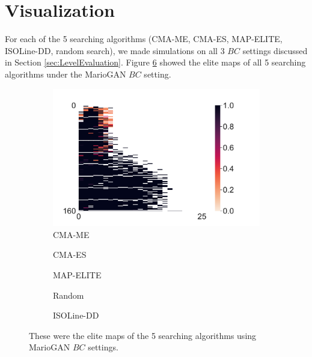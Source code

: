 \documentclass[conference]{IEEEtran}
\begin{document}
\section{Visualization}\label{sec:Visualization}
For each of the 5 searching algorithms (CMA-ME, CMA-ES, MAP-ELITE, ISOLine-DD, random search), we made simulations 
on all 3 $BC$ settings discussed in Section \ref{sec:LevelEvaluation}. Figure \ref{fig:MarioGANBC} showed the elite 
maps of all 5 searching algorithms under the MarioGAN $BC$ setting.
\begin{figure}[t!]
    \centering
    \begin{subfigure}[b]{.18\linewidth}
        \centering
        \includegraphics[width=\linewidth]{MarioGAN_map.pdf}
        CMA-ME
        \label{fig:CMAME_MarioGANBC}
    \end{subfigure}
    \begin{subfigure}[b]{.18\linewidth}
        \centering

        CMA-ES
        \label{fig:CMAES_MarioGANBC}
    \end{subfigure}
    \begin{subfigure}[b]{.18\linewidth}
        \centering
        
        MAP-ELITE
        \label{fig:MAPELITE_MarioGANBC}
    \end{subfigure}
    \begin{subfigure}[b]{.18\linewidth}
        \centering
        
        Random
        \label{fig:RANDOM_MarioGANBC}
    \end{subfigure}
    \begin{subfigure}[b]{.18\linewidth}
        \centering
        
        ISOLine-DD
        \label{fig:ISOLINEDD_MarioGANBC}
    \end{subfigure}
\caption{These were the elite maps of the 5 searching algorithms using MarioGAN $BC$ settings.}
\label{fig:MarioGANBC}
\end{figure}
\end{document}
